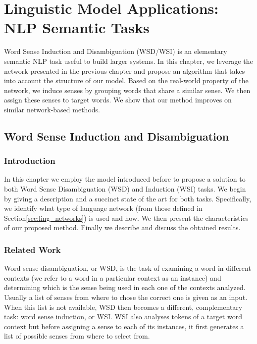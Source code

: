 \chapter{Linguistic Model Applications: NLP Semantic Tasks} 
\label{chap:wsd}
\begin{abstractchap}
Word Sense Induction and Disambiguation (WSD/WSI) is an elementary semantic NLP task useful to build larger systems. In this chapter, we leverage the network presented in the previous chapter and propose an algorithm that takes into account the structure of our model. Based on the real-world property of the network, we induce senses by grouping words that share a similar sense. We then assign these senses to target words. We show that our method improves on similar network-based methods.
\end{abstractchap}

\minitoc
\section{Word Sense Induction and Disambiguation}
\subsection{Introduction}
\label{chap5:intro}
In this chapter we employ the model introduced before to propose a solution to both Word Sense Disambiguation (WSD) and Induction  (WSI) tasks. We begin by giving a description and a succinct state of the art for both tasks. Specifically, we identify what type of language network (from those defined in Section\ref{sec:ling_networks}) is used and how.
We then present the characteristics of our proposed method. Finally we describe and discuss the obtained results.

\subsection{Related Work}

Word sense disambiguation, or WSD, is the task of examining a word in different contexts (we refer to a word in a particular context as an instance)  and determining which is the sense being used in each one of the contexts analyzed. Usually a list of senses from where to chose the correct one is given as an input. When this list is not available, WSD then becomes a different, complementary task: word sense induction, or WSI. WSI also analyses  tokens of a target word context but before assigning a sense to each of its instances, it first generates a list of possible senses from where to select from. 

